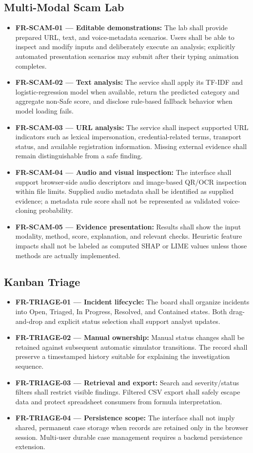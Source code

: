 \documentclass[12pt,a4paper,oneside]{report}
\newcommand{\req}[2]{\item \textbf{#1:} #2}
\begin{document}
\subsection{Multi-Modal Scam Lab}
\begin{itemize}
\req{FR-SCAM-01 --- Editable demonstrations}{The lab shall provide prepared URL, text, and voice-metadata scenarios. Users shall be able to inspect and modify inputs and deliberately execute an analysis; explicitly automated presentation scenarios may submit after their typing animation completes.}
\req{FR-SCAM-02 --- Text analysis}{The service shall apply its TF-IDF and logistic-regression model when available, return the predicted category and aggregate non-Safe score, and disclose rule-based fallback behavior when model loading fails.}
\req{FR-SCAM-03 --- URL analysis}{The service shall inspect supported URL indicators such as lexical impersonation, credential-related terms, transport status, and available registration information. Missing external evidence shall remain distinguishable from a safe finding.}
\req{FR-SCAM-04 --- Audio and visual inspection}{The interface shall support browser-side audio descriptors and image-based QR/OCR inspection within file limits. Supplied audio metadata shall be identified as supplied evidence; a metadata rule score shall not be represented as validated voice-cloning probability.}
\req{FR-SCAM-05 --- Evidence presentation}{Results shall show the input modality, method, score, explanation, and relevant checks. Heuristic feature impacts shall not be labeled as computed SHAP or LIME values unless those methods are actually implemented.}
\end{itemize}

\subsection{Kanban Triage}
\begin{itemize}
\req{FR-TRIAGE-01 --- Incident lifecycle}{The board shall organize incidents into Open, Triaged, In Progress, Resolved, and Contained states. Both drag-and-drop and explicit status selection shall support analyst updates.}
\req{FR-TRIAGE-02 --- Manual ownership}{Manual status changes shall be retained against subsequent automatic simulator transitions. The record shall preserve a timestamped history suitable for explaining the investigation sequence.}
\req{FR-TRIAGE-03 --- Retrieval and export}{Search and severity/status filters shall restrict visible findings. Filtered CSV export shall safely escape data and protect spreadsheet consumers from formula interpretation.}
\req{FR-TRIAGE-04 --- Persistence scope}{The interface shall not imply shared, permanent case storage when records are retained only in the browser session. Multi-user durable case management requires a backend persistence extension.}
\end{itemize}
\end{document}
